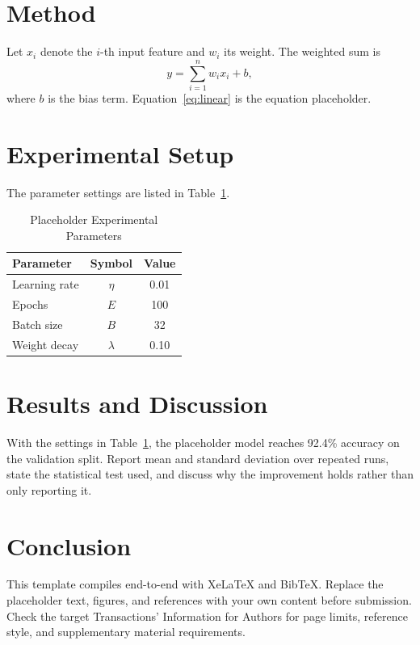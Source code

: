 \documentclass[journal,10pt]{IEEEtran}
\begin{document}
\section{Method}
\label{sec:method}
Let $x_i$ denote the $i$-th input feature and $w_i$ its weight. The weighted sum is
\begin{equation}
  y=\sum_{i=1}^{n} w_i x_i + b,
  \label{eq:linear}
\end{equation}
where $b$ is the bias term. Equation~\eqref{eq:linear} is the equation placeholder.

\section{Experimental Setup}
\label{sec:setup}
The parameter settings are listed in Table~\ref{tab:params}.

\begin{table}[h]
  \renewcommand{\arraystretch}{1.2}
  \caption{Placeholder Experimental Parameters}
  \label{tab:params}
  \centering
  \begin{tabular}{lcc}
    \toprule
    Parameter & Symbol & Value \\
    \midrule
    Learning rate & $\eta$    & 0.01 \\
    Epochs        & $E$       & 100  \\
    Batch size    & $B$       & 32   \\
    Weight decay  & $\lambda$ & 0.10 \\
    \bottomrule
  \end{tabular}
\end{table}

\section{Results and Discussion}
\label{sec:results}
With the settings in Table~\ref{tab:params}, the placeholder model reaches 92.4\% accuracy
on the validation split. Report mean and standard deviation over repeated runs, state the
statistical test used, and discuss why the improvement holds rather than only reporting it.

\section{Conclusion}
\label{sec:conclusion}
This template compiles end-to-end with XeLaTeX and BibTeX. Replace the placeholder text,
figures, and references with your own content before submission. Check the target
Transactions' Information for Authors for page limits, reference style, and supplementary
material requirements.
\end{document}
